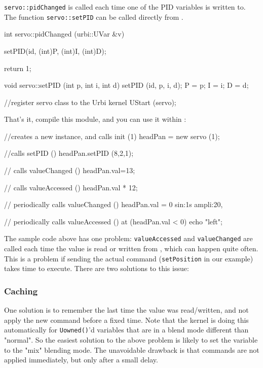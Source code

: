\lstinline{servo::pidChanged} is called each time one of the PID
variables is written to. The function \lstinline{servo::setPID} can be
called directly from \urbi.

\begin{urbiscript}
int
servo::pidChanged (urbi::UVar &v)
{
  setPID(id, (int)P, (int)I, (int)D);

  return 1;
}

void
servo::setPID (int p, int i, int d)
{
  setPID (id, p, i, d);
  P = p;
  I = i;
  D = d;
}

//register servo class to the Urbi kernel
UStart (servo);
\end{urbiscript}

That's it, compile this module, and you can use it within \urbi:

\begin{urbiscript}
//creates a new instance, and calls init (1)
headPan = new servo (1);

//calls setPID ()
headPan.setPID (8,2,1);

// calls valueChanged ()
headPan.val=13;

// calls valueAccessed ()
headPan.val * 12;

// periodically calls valueChanged ()
headPan.val = 0 sin:1s ampli:20,

// periodically calls valueAccessed ()
at (headPan.val < 0)
  echo "left";
\end{urbiscript}

The sample code above has one problem: \lstinline{valueAccessed} and
\lstinline{valueChanged} are called each time the value is read or
written from \urbi, which can happen quite often. This is a problem if
sending the actual command (\lstinline{setPosition} in our example)
takes time to execute. There are two solutions to this issue:

\subsubsection{Caching}

One solution is to remember the last time the value was read/written,
and not apply the new command before a fixed time. Note that the
kernel is doing this automatically for \lstinline{Uowned()}'d
variables that are in a blend mode different than "normal". So the
easiest solution to the above problem is likely to set the variable to
the "mix" blending mode. The unavoidable drawback is that commands are
not applied immediately, but only after a small delay.

